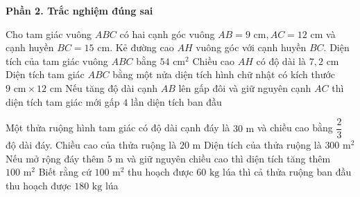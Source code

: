 \textbf{Phần 2. Trắc nghiệm đúng sai}

\begin{ex} %
Cho tam giác vuông $ABC$ có hai cạnh góc vuông $AB = 9\text{ cm}, AC = 12\text{ cm}$ và cạnh huyền $BC = 15\text{ cm}$. Kẻ đường cao $AH$ vuông góc với cạnh huyền $BC$.
\choiceTF
{\True Diện tích của tam giác vuông $ABC$ bằng $54\text{ cm}^2$}
{\True Chiều cao $AH$ có độ dài là $7{,}2\text{ cm}$}
{\True Diện tích tam giác $ABC$ bằng một nửa diện tích hình chữ nhật có kích thước $9\text{ cm} \times 12\text{ cm}$}
{Nếu tăng độ dài cạnh $AB$ lên gấp đôi và giữ nguyên cạnh $AC$ thì diện tích tam giác mới gấp $4$ lần diện tích ban đầu}
\end{ex}

\begin{ex} %
Một thửa ruộng hình tam giác có độ dài cạnh đáy là $30\text{ m}$ và chiều cao bằng $\dfrac{2}{3}$ độ dài đáy.
\choiceTF
{\True Chiều cao của thửa ruộng là $20\text{ m}$}
{\True Diện tích của thửa ruộng là $300\text{ m}^2$}
{Nếu mở rộng đáy thêm $5\text{ m}$ và giữ nguyên chiều cao thì diện tích tăng thêm $100\text{ m}^2$}
{\True Biết rằng cứ $100\text{ m}^2$ thu hoạch được $60\text{ kg}$ lúa thì cả thửa ruộng ban đầu thu hoạch được $180\text{ kg}$ lúa}
\end{ex}

